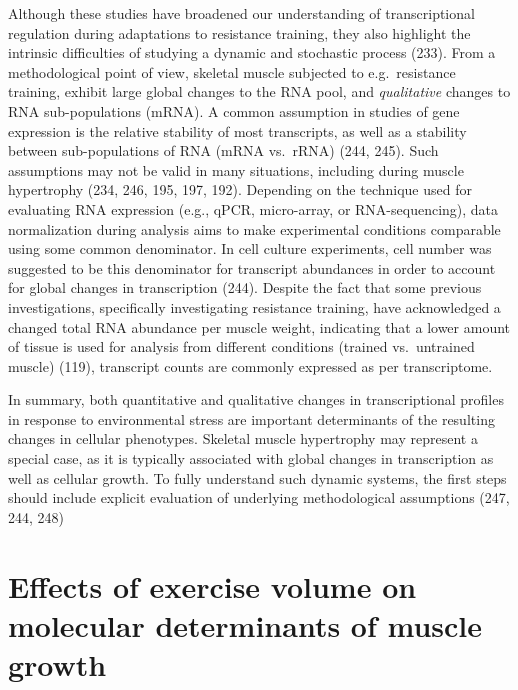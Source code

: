 \documentclass[twoside,10pt]{gihclass} %
\begin{document}
Although these studies have broadened our understanding of transcriptional regulation during adaptations to resistance training, they also highlight the intrinsic difficulties of studying a dynamic and stochastic process
(233).
From a methodological point of view, skeletal muscle subjected to e.g.~resistance training, exhibit large global changes to the RNA pool, and \emph{qualitative} changes to RNA sub-populations (mRNA).
A common assumption in studies of gene expression is the relative stability of most transcripts, as well as a stability between sub-populations of RNA (mRNA vs.~rRNA)
(244, 245).
Such assumptions may not be valid in many situations, including during muscle hypertrophy
(234, 246, 195, 197, 192).
Depending on the technique used for evaluating RNA expression (e.g., qPCR, micro-array, or RNA-sequencing), data normalization during analysis aims to make experimental conditions comparable using some common denominator.
In cell culture experiments, cell number was suggested to be this denominator for transcript abundances in order to account for global changes in transcription
(244).
Despite the fact that some previous investigations, specifically investigating resistance training, have acknowledged a changed total RNA abundance per muscle weight, indicating that a lower amount of tissue is used for analysis from different conditions (trained vs.~untrained muscle)
(119),
transcript counts are commonly expressed as per transcriptome.

In summary, both quantitative and qualitative changes in transcriptional profiles in response to environmental stress are important determinants of the resulting changes in cellular phenotypes. Skeletal muscle hypertrophy may represent a special case, as it is typically associated with global changes in transcription as well as cellular growth. To fully understand such dynamic systems, the first steps should include explicit evaluation of underlying methodological assumptions
(247, 244, 248)

\hypertarget{effects-of-exercise-volume-on-molecular-determinants-of-muscle-growth}{%
\section{Effects of exercise volume on molecular determinants of muscle growth}\label{effects-of-exercise-volume-on-molecular-determinants-of-muscle-growth}}
\end{document}
